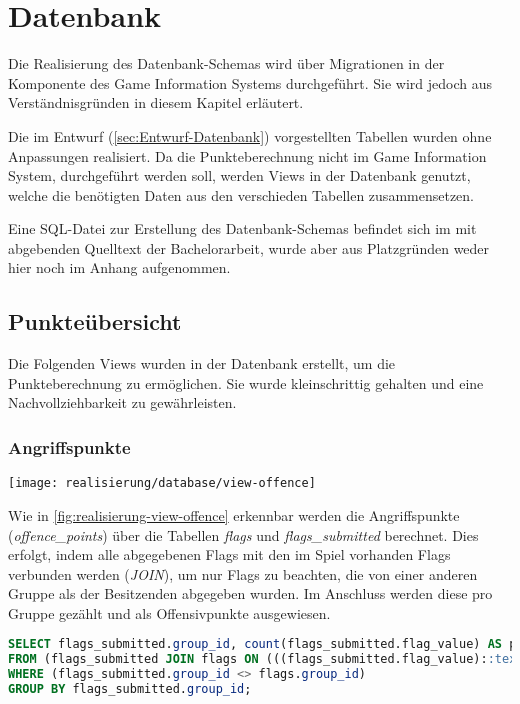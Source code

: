 \section{Datenbank}\label{sec:Realisierung-Datenbank}

Die Realisierung des Datenbank-Schemas wird über Migrationen in der Komponente des Game Information Systems durchgeführt. Sie wird jedoch aus Verständnisgründen in diesem Kapitel erläutert.

Die im Entwurf (\autoref{sec:Entwurf-Datenbank}) vorgestellten Tabellen wurden ohne Anpassungen realisiert. Da die Punkteberechnung nicht im Game Information System, durchgeführt werden soll, werden Views in der Datenbank genutzt, welche die benötigten Daten aus den verschieden Tabellen zusammensetzen.

Eine SQL-Datei zur Erstellung des Datenbank-Schemas befindet sich im mit abgebenden Quelltext der Bachelorarbeit, wurde aber aus Platzgründen weder hier noch im Anhang aufgenommen.

\subsection{Punkteübersicht}
Die Folgenden Views wurden in der Datenbank erstellt, um die Punkteberechnung zu ermöglichen. Sie wurde kleinschrittig gehalten und eine Nachvollziehbarkeit zu gewährleisten.

\subsubsection{Angriffspunkte}\label{subsubsec:Angriffspunkte}
\begin{center}
	\texttt{[image: realisierung/database/view-offence]}
	\label{fig:realisierung-view-offence}
\end{center}

Wie in \autoref{fig:realisierung-view-offence} erkennbar werden die Angriffspunkte (\textit{offence\_points}) über die Tabellen \textit{flags} und \textit{flags\_submitted} berechnet. Dies erfolgt, indem alle abgegebenen Flags mit den im Spiel vorhanden Flags verbunden werden (\textit{JOIN}), um nur Flags zu beachten, die von einer anderen Gruppe als der Besitzenden abgegeben wurden. Im Anschluss werden diese pro Gruppe gezählt und als Offensivpunkte ausgewiesen.

\begin{lstlisting}[frame=single, language=sql, caption={SQL View Angriffspunkte}, captionpos=b, label={lst:database-offence-points}]
SELECT flags_submitted.group_id, count(flags_submitted.flag_value) AS points
FROM (flags_submitted JOIN flags ON (((flags_submitted.flag_value)::text = (flags.flag_value)::text)))
WHERE (flags_submitted.group_id <> flags.group_id)
GROUP BY flags_submitted.group_id;
\end{lstlisting}

